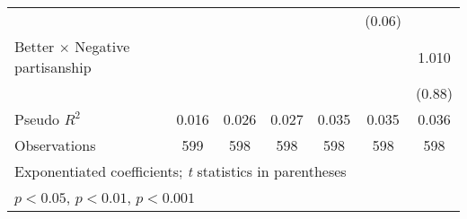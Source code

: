 {\begin{tabular}{l*{6}{c}}
                &                  &                  &                  &                  &   (0.06)         &                  \\
Better $\times$ Negative partisanship&                  &                  &                  &                  &                  &    1.010         \\
                &                  &                  &                  &                  &                  &   (0.88)         \\
\midrule
Pseudo \(R^{2}\)&    0.016         &    0.026         &    0.027         &    0.035         &    0.035         &    0.036         \\
Observations    &      599         &      598         &      598         &      598         &      598         &      598         \\
\bottomrule
\multicolumn{7}{l}{\footnotesize Exponentiated coefficients; \textit{t} statistics in parentheses}\\
\multicolumn{7}{l}{\footnotesize \sym{*} \(p<0.05\), \sym{**} \(p<0.01\), \sym{***} \(p<0.001\)}\\
\end{tabular}
}
